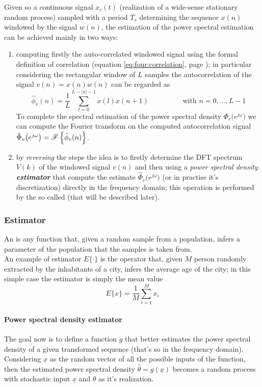 		Given so a continuous signal $x_c(t)$ (realization of a wide-sense stationary random process) sampled with a period $T_s$ determining the sequence $x(n)$ windowed by the signal $w(n)$, the estimation of the power spectral estimation can be achieved mainly in two ways:
		\begin{enumerate}
			\item computing firstly the auto-correlated windowed signal using the formal definition of correlation (equation \ref{eq:four:correlation}, page \pageref{eq:four:correlation}); in particular considering the rectangular window of $L$ samples the autocorrelation of the signal $v(n) = x(n) w(n)$ can be regarded as
			\begin{equation} \label{eq:dft:windowedautocorr}
				\hat \phi_v(n) = \frac 1 L \sum_{l=0}^{L-|n|-1} x(l) x(n+1) \hspace{2cm} \textrm{with } n = 0,\dots, L-1 
			\end{equation}
			To complete the spectral estimation of the power spectral density $\Phi_v\big(e^{j\omega}\big)$ we can compute the Fourier transform on the computed autocorrelation signal $\hat \Phi_v\big(e^{j\omega}\big) = \mathscr{F}\left\{ \hat \phi_v(n) \right\}$.
			
			\item by \textit{reversing} the steps the idea is to firstly determine the DFT spectrum $V(k)$ of the windowed signal $v(n)$ and then using a \textit{power spectral density \textbf{estimator}} that compute the estimate $\hat \Phi_v\big(e^{j\omega}\big)$ (or in practise it's discretization) directly in the frequency domain; this operation is performed by the so called  (that will be described later).			 
		\end{enumerate}
	
		\subsubsection{Estimator}
		An  is any function that, given a random sample from a population, infers a parameter of the population that the samples is taken from.\\
		An example of estimator $E\{\cdot\}$ is the operator that, given $M$ person randomly extracted by the inhabitants of a city, infers the average age of the city; in this simple case the estimator is simply the mean value
		\[ E\{x\} = \frac 1 M \sum_{i=1}^M x_i \]
		
		\paragraph{Power spectral density estimator} The goal now is to define a function $g$ that better estimates the power spectral density of a given transformed sequence (that's so in the frequency domain). Considering $\underline x$ as the random vector of all the possible inputs of the function, then the estimated power spectral density $\hat \theta  = g(\underline x)$ becomes a random process  with stochastic input $\underline x$ and $\theta$ as it's realization.
		
